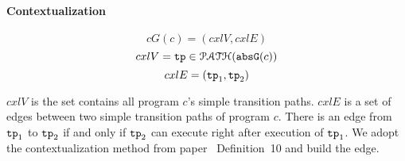 
\paragraph{Contextualization}

\[
  cG(c) = (cxlV, cxlE)
  \]
  \[cxlV = \mathtt{tp} \in \mathcal{PATH}(\mathtt{abs}{\mathtt{G}}(c))
  \]
  \[
    cxlE = (\mathtt{tp}_1, \mathtt{tp}_2)\]

    $cxlV$ is the set contains all program $c$'s simple transition paths.
$cxlE$ is a set of edges between two simple transition paths of program $c$. There is an edge from $\mathtt{tp}_1$ to $\mathtt{tp}_2$
if and only if $\mathtt{tp}_2$ can execute right after execution of $\mathtt{tp}_1$.
We adopt the contextualization method from paper~\cite{ZulegerGSV11} Definition~10 and build the edge.
